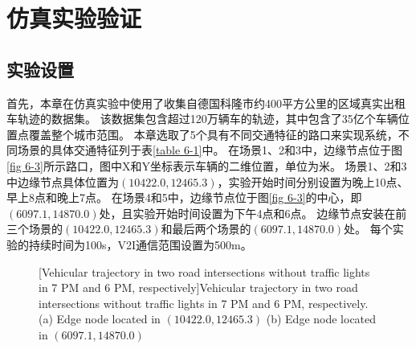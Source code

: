 \section{仿真实验验证}\label{section 6-4}

\subsection{实验设置}

首先，本章在仿真实验中使用了收集自德国科隆市约400平方公里的区域真实出租车轨迹的数据集\cite{uppoor2013generation}。
该数据集包含超过120万辆车的轨迹，其中包含了35亿个车辆位置点覆盖整个城市范围。
本章选取了5个具有不同交通特征的路口来实现系统，不同场景的具体交通特征列于表\ref{table 6-1}中。
在场景1、2和3中，边缘节点位于图\ref{fig 6-3}所示路口，图中X和Y坐标表示车辆的二维位置，单位为米。
场景1、2和3中边缘节点具体位置为$(10422.0, 12465.3)$，实验开始时间分别设置为晚上10点、早上8点和晚上7点。
在场景4和5中，边缘节点位于图\ref{fig 6-3}的中心，即$(6097.1, 14870.0)$处，且实验开始时间设置为下午4点和6点。
边缘节点安装在前三个场景的$(10422.0, 12465.3)$和最后两个场景的$(6097.1, 14870.0)$处。
每个实验的持续时间为100s，V2I通信范围设置为500m。

\begin{table}[h]
\centering
{}
\label{table 6-1}
\end{table}


\begin{figure}[h]
     \centering
     [Vehicular trajectory in two road intersections without traffic lights in 7 PM and 6 PM, respectively]{Vehicular trajectory in two road intersections without traffic lights in 7 PM and 6 PM, respectively. (a) Edge node located in $(10422.0, 12465.3)$ (b) Edge node located in $(6097.1, 14870.0)$}
     \label{fig 6-4}
\end{figure}

